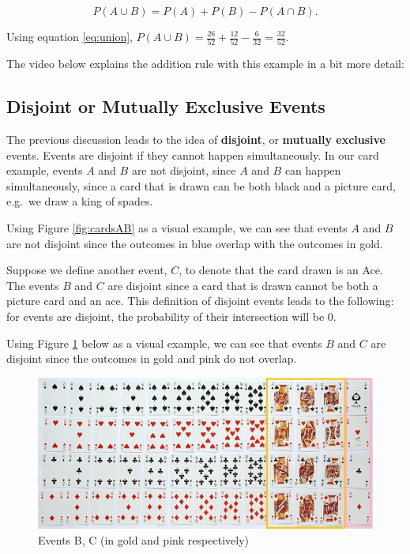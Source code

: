 \documentclass[
]{book}
\begin{document}
\begin{equation} 
P(A \cup B) = P(A) + P(B) - P(A \cap B).
\label{eq:union}
\end{equation}

Using equation \eqref{eq:union}, \(P(A \cup B) = \frac{26}{52} + \frac{12}{52} - \frac{6}{32} = \frac{32}{52}\).

The video below explains the addition rule with this example in a bit more detail:

\subsection{Disjoint or Mutually Exclusive Events}\label{disjoint-or-mutually-exclusive-events}

The previous discussion leads to the idea of \textbf{disjoint}, or \textbf{mutually exclusive} events. Events are disjoint if they cannot happen simultaneously. In our card example, events \(A\) and \(B\) are not disjoint, since \(A\) and \(B\) can happen simultaneously, since a card that is drawn can be both black and a picture card, e.g.~we draw a king of spades.

Using Figure \ref{fig:cardsAB} as a visual example, we can see that events \(A\) and \(B\) are not disjoint since the outcomes in blue overlap with the outcomes in gold.

Suppose we define another event, \(C\), to denote that the card drawn is an Ace. The events \(B\) and \(C\) are disjoint since a card that is drawn cannot be both a picture card and an ace. This definition of disjoint events leads to the following: for events are disjoint, the probability of their intersection will be 0.

Using Figure \ref{fig:cardsBC} below as a visual example, we can see that events \(B\) and \(C\) are disjoint since the outcomes in gold and pink do not overlap.

\begin{figure}
\centering
\includegraphics{images/02-cardsBC.jpg}
\caption{\label{fig:cardsBC}Events B, C (in gold and pink respectively)}
\end{figure}
\end{document}
